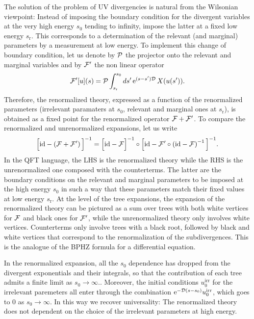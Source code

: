 \documentclass[10pt,here,feynmf]{article}
\begin{document}
The solution of the problem of UV divergencies is natural from the Wilsonian viewpoint: Instead of imposing the boundary condition for the divergent variables at the very high energy $s_{0}$ tending to infinity, impose the latter at a fixed low energy $s_{\mathrm{r}}$. This corresponds to a determination of the relevant (and marginal) parameters by a measurement at low energy. To implement this change of boundary condition, let us denote by ${\cal P}$ the projector onto the relevant and marginal variables and by ${\cal F}'$ the non linear operator  
\begin{equation}
{\cal F}'[u](s)={\cal P}
\int_{s_{\mathrm{r}}}^{s_{0}}ds'\, \mathrm{e}^{(s-s'){\cal D}}\,X(u(s')).
\end{equation}
Therefore, the renormalized theory, expressed as a function of the renormalized parameters (irrelevant paramaters at $s_{0}$, relevant and marginal ones at $s_{\mathrm{r}}$), is obtained as a fixed point for the renormalized operator ${\cal F}+{\cal F}'$. To compare the renormalized and unrenormalized expansions, let us write
\begin{equation}
\Big[\mathrm{id}-\left({\cal F}+{\cal F}'\right)\Big]^{-1}= \Big[\mathrm{id}-{\cal F}\Big]^{-1}\circ
\Big[\mathrm{id}-{\cal F}'\circ\left(\mathrm{id}-{\cal F}\right)^{-1}\Big]^{-1}.
\end{equation}
In the QFT language, the LHS is the renormalized theory while the RHS is the unrenormalized one composed with the counterterms. The latter are the boundary conditions on the relevant and marginal parameters to be imposed at the high energy $s_{0}$ in such a way that these parameters match their fixed values at low energy $s_{\mathrm{r}}$. At the level of the tree expansions, the expansion of the renormalized theory can be pictured as a sum over trees with  both white vertices for ${\cal F}$ and black ones for ${\cal F}'$, while the unrenormalized theory only involves white vertices.
Counterterms only involve trees with a black root, followed by black and white vertices that correspond to the renormalization of the subdivergences. This is the analogue of the BPHZ formula for a differential equation.  

In the renormalized expansion, all the $s_{0}$ dependence has dropped from the divergent exponentials and their integrals,  so that the contribution of each tree admits a finite limit as $s_{0}\rightarrow\infty$.. Moreover, the initial conditions $u_{0}^{\mathrm{irr}}$ for the irrelevant paremeters all enter through the combination $\mathrm{e}^{-{\cal D}(s-s_{0})}u_{0}^{\mathrm{irr}}$, which goes to $0$ as $s_{0}\rightarrow\infty$.  In this way we recover universality: The renormalized theory does not dependent on the choice of the irrelevant parameters at high energy. 
 
\end{document}
